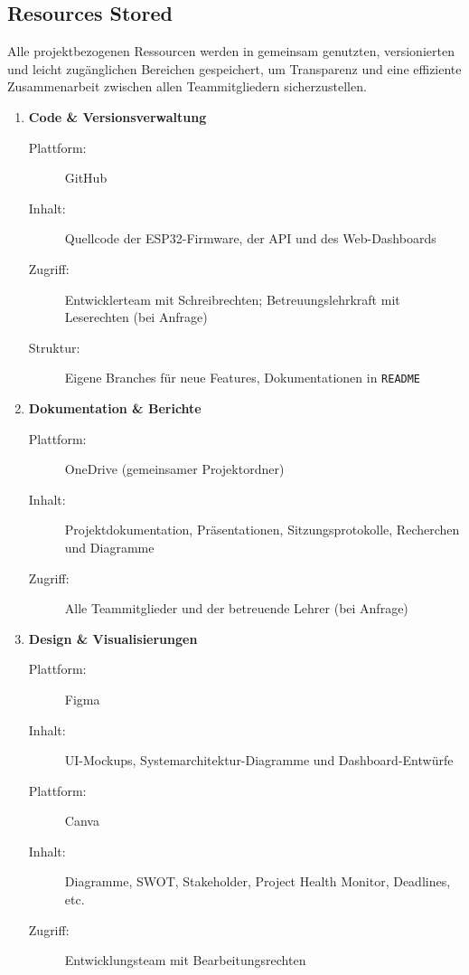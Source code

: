 \documentclass{article}
\begin{document}
\subsection{Resources Stored}
Alle projektbezogenen Ressourcen werden in gemeinsam genutzten, versionierten und leicht zugänglichen Bereichen gespeichert, um Transparenz und eine effiziente Zusammenarbeit zwischen allen Teammitgliedern sicherzustellen.

\begin{enumerate}[left=1.5em,label=\arabic*.]
  \item \textbf{Code \& Versionsverwaltung}
  \begin{description}
    \item[Plattform:] GitHub
    \item[Inhalt:] Quellcode der ESP32-Firmware, der API und des Web-Dashboards
    \item[Zugriff:] Entwicklerteam mit Schreibrechten; Betreuungslehrkraft mit Leserechten (bei Anfrage)
    \item[Struktur:] Eigene Branches für neue Features, Dokumentationen in \texttt{README}
  \end{description}

  \item \textbf{Dokumentation \& Berichte}
  \begin{description}
    \item[Plattform:] OneDrive (gemeinsamer Projektordner)
    \item[Inhalt:] Projektdokumentation, Präsentationen, Sitzungsprotokolle, Recherchen und Diagramme
    \item[Zugriff:] Alle Teammitglieder und der betreuende Lehrer (bei Anfrage)
  \end{description}

\pagebreak

  \item \textbf{Design \& Visualisierungen}
  \begin{description}
    \item[Plattform:] Figma
    \item[Inhalt:] UI-Mockups, Systemarchitektur-Diagramme und Dashboard-Entwürfe
    \item[Plattform:] Canva
    \item[Inhalt:] Diagramme, SWOT, Stakeholder, Project Health Monitor, Deadlines, etc.
    \item[Zugriff:] Entwicklungsteam mit Bearbeitungsrechten
  \end{description}


\end{enumerate}
\end{document}
